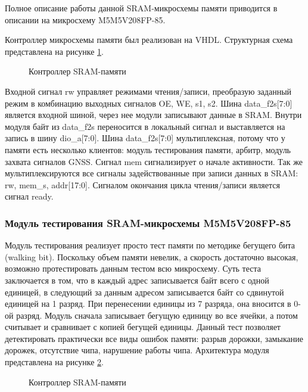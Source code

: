 Полное описание работы данной SRAM-микросхемы памяти приводится в описании на микросхему M5M5V208FP-85.

Контроллер микросхемы памяти был реализован на VHDL. Структурная схема представлена на рисунке \ref{pic:sram_arch}.

\begin{figure}[H]
\begin{center}
\end{center}
\caption{Контроллер SRAM-памяти}
\label{pic:sram_arch}
\end{figure}

Входной сигнал rw управляет режимами чтения/записи, преобразую заданный режим в комбинацию выходных сигналов OE, WE, s1, s2.
Шина data\_f2s[7:0] является входной шиной, через нее модули записывают данные в SRAM. Внутри модуля байт из data\_f2s
переносится в локальный сигнал и выставляется на запись в шину dio\_a[7:0]. Шина data\_f2s[7:0] мультиплексная, потому что 
у памяти есть несколько клиентов: модуль тестирования памяти, арбитр, модуль захвата сигналов GNSS. Сигнал mem сигнализирует о начале
активности. Так же мультиплексируются все сигналы задействованные при записи данных в SRAM: rw, mem\_s, addr[17:0]. Сигналом окончания
цикла чтения/записи является сигнал ready.

\subsubsection*{Модуль тестирования SRAM-микросхемы M5M5V208FP-85}
\label{sec:test_sram}
Модуль тестирования реализует просто тест памяти по методике бегущего бита (walking bit). Поскольку объем памяти невелик, а скорость
достаточно высокая, возможно протестировать данным тестом всю микросхему. Суть теста заключается в том, что в каждый адрес записывается
байт всего с одной единицей, в следующий за данным адресом записывается байт со сдвинутой единицей на 1 разряд. При перенесении единицы
из 7 разряда, она вносится в 0-ой разряд. Модуль сначала записывает бегущую единицу во все ячейки, а потом считывает и сравнивает с
копией бегущей единицы. Данный тест позволяет детектировать практически все виды ошибок памяти:
разрыв дорожки, замыкание дорожек, отсутствие чипа, нарушение работы чипа. Архитектура модуля представлена на рисунке
\ref{pic:test_sram_arch}.

\begin{figure}[h]
\begin{center}
\end{center}
\caption{Контроллер SRAM-памяти}
\label{pic:test_sram_arch}
\end{figure}

